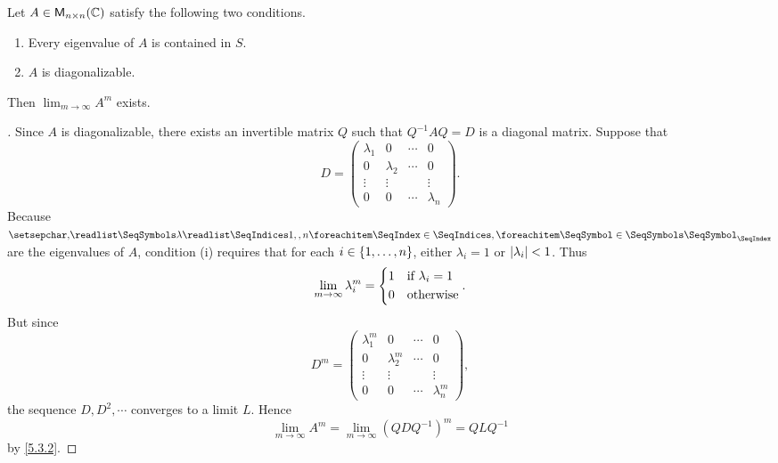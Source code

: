 \begin{thm}\label{5.14}
	Let \(A \in \mathsf{M}_{{n} \times n}({\mathbb{C}})\) satisfy the following two conditions.
	\begin{enumerate}
		\item Every eigenvalue of \(A\) is contained in \(S\).
		\item \(A\) is diagonalizable.
	\end{enumerate}
	Then \(\lim_{m \to \infty} A^m\) exists.
\end{thm}

\begin{proof}[]
	Since \(A\) is diagonalizable, there exists an invertible matrix \(Q\) such that \(Q^{-1} A Q = D\) is a diagonal matrix.
	Suppose that
	\[
		D = \begin{pmatrix}
			\lambda_1 & 0         & \cdots & 0         \\
			0         & \lambda_2 & \cdots & 0         \\
			\vdots    & \vdots    &        & \vdots    \\
			0         & 0         & \cdots & \lambda_n
		\end{pmatrix}.
	\]
	Because \(\seq{\lambda}{1,,n}\) are the eigenvalues of \(A\), condition (i) requires that for each \(i \in \left\lbrace1, \dots, n\right\rbrace\), either \(\lambda_i = 1\) or \(\left\lvert\lambda_i\right\rvert < 1\).
	Thus
	\[
		\lim_{m \to \infty} \lambda_i^m = \begin{dcases}
			1 & \text{if } \lambda_i = 1 \\
			0 & \text{otherwise}
		\end{dcases}.
	\]
	But since
	\[
		D^m = \begin{pmatrix}
			\lambda_1^m & 0           & \cdots & 0           \\
			0           & \lambda_2^m & \cdots & 0           \\
			\vdots      & \vdots      &        & \vdots      \\
			0           & 0           & \cdots & \lambda_n^m
		\end{pmatrix},
	\]
	the sequence \(D, D^2, \cdots\) converges to a limit \(L\).
	Hence
	\[
		\lim_{m \to \infty} A^m = \lim_{m \to \infty} (Q D Q^{-1})^m = Q L Q^{-1}
	\]
	by \cref{5.3.2}.
\end{proof}

